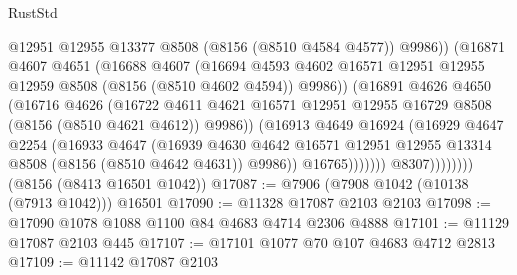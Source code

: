 \begin{lexlean}{RustStd}
\begin{coremodule}
                              @12951
                              @12955
                              @13377
                              @8508
                              (@8156 (@8510 @4584 @4577))
                              @9986))
                          (@16871
                            @4607
                            @4651
                            (@16688
                              @4607
                              (@16694
                                @4593
                                @4602
                                @16571
                                @12951
                                @12955
                                @12959
                                @8508
                                (@8156 (@8510 @4602 @4594))
                                @9986))
                            (@16891
                              @4626
                              @4650
                              (@16716
                                @4626
                                (@16722
                                  @4611
                                  @4621
                                  @16571
                                  @12951
                                  @12955
                                  @16729
                                  @8508
                                  (@8156 (@8510 @4621 @4612))
                                  @9986))
                              (@16913
                                @4649
                                @16924
                                (@16929
                                  @4647
                                  @2254
                                  (@16933
                                    @4647
                                    (@16939
                                      @4630
                                      @4642
                                      @16571
                                      @12951
                                      @12955
                                      @13314
                                      @8508
                                      (@8156 (@8510 @4642 @4631))
                                      @9986))
                                  @16765)))))))
                    @8307))))))))
    (@8156 (@8413 @16501 @1042))
@17087 := @7906 (@7908 @1042 (@10138 (@7913 @1042))) @16501
@17090 := @11328 @17087 @2103 @2103
@17098 := @17090 @1078 @1088 @1100 @84 @4683 @4714 @2306 @4888
@17101 := @11129 @17087 @2103 @445
@17107 := @17101 @1077 @70 @107 @4683 @4712 @2813
@17109 := @11142 @17087 @2103

\end{coremodule}
\end{lexlean}
